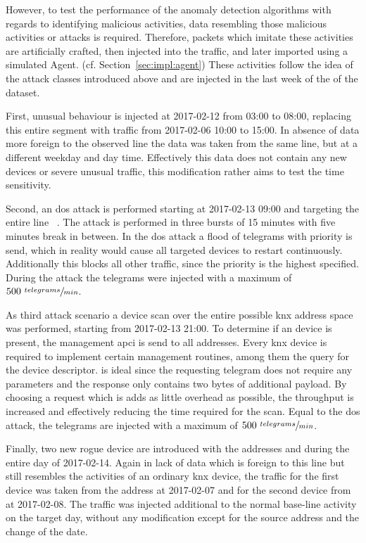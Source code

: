 However, to test the performance of the anomaly detection algorithms with regards to identifying malicious activities, data resembling those malicious activities or attacks is required.
Therefore, packets which imitate these activities are artificially crafted, then injected into the traffic, and later imported using a simulated Agent. (cf. Section~\ref{sec:impl:agent})
These activities follow the idea of the attack classes introduced above and are injected in the last week of the of the dataset.

First, unusual behaviour is injected at 2017-02-12 from 03:00 to 08:00, replacing this entire segment with traffic from 2017-02-06 10:00 to 15:00. In absence of data more foreign to the observed line the data was taken from the same line, but at a different weekday and day time. Effectively this data does not contain any new devices or severe unusual traffic, this modification rather aims to test the time sensitivity.

Second, an \gls{dos} attack is performed starting at 2017-02-13 09:00 and targeting the entire line ~. The attack is performed in three bursts of 15 minutes with five minutes break in between. In the \gls{dos} attack a flood of  telegrams with  priority is send, which in reality would cause all targeted devices to restart continuously. Additionally this blocks all other traffic, since the  priority is the highest specified. During the attack the telegrams were injected with a maximum of \(500 \ \sfrac{telegrams}{min}\).

As third attack scenario a device scan over the entire possible \gls{knx} address space was performed, starting from 2017-02-13 21:00.
To determine if an device is present, the management \gls{apci}\break{} is send to all addresses. Every \gls{knx} device is required to implement certain management routines, among them the query for the device descriptor.  is ideal since the requesting telegram does not require any parameters and the response only contains two bytes of additional payload. By choosing a request which is adds as little overhead as possible, the throughput is increased and effectively reducing the time required for the scan. \parencite[cf.][p.~46]{DIN_EN_50090-4-1}
Equal to the \gls{dos} attack, the telegrams are injected with a maximum of \(500 \ \sfrac{telegrams}{min}\).

Finally, two new rogue device are introduced with the addresses  and  during the entire day of 2017-02-14.
Again in lack of data which is foreign to this line but still resembles the activities of an ordinary \gls{knx} device, the traffic for the first device was taken from the address  at 2017-02-07 and for the second device from  at 2017-02-08.
The traffic was injected additional to the normal base-line activity on the target day, without any modification except for the source address and the change of the date.

